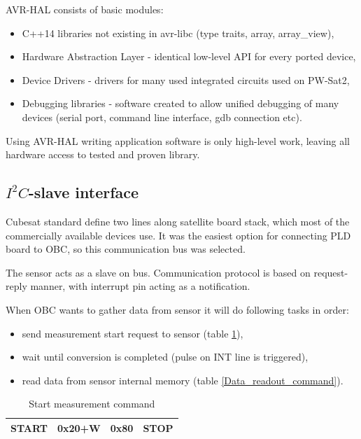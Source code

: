     AVR-HAL consists of basic modules:
    \begin{itemize}
        \item C++14 libraries not existing in avr-libc (type traits, array, array\_view),
        \item Hardware Abstraction Layer - identical low-level API for every ported device,
        \item Device Drivers - drivers for many used integrated circuits used on PW-Sat2,
        \item Debugging libraries - software created to allow unified debugging of many devices (serial port, command line interface, gdb connection etc).
    \end{itemize}

    Using AVR-HAL writing application software is only high-level work, leaving all hardware access to tested and proven library.

    \subsection{$I^2C$-slave interface}
    Cubesat standard define two \iic lines along satellite board stack, which most of the commercially available devices use. It was the easiest option for connecting PLD board to OBC, so this communication bus was selected.

    The sensor acts as a slave on \iic bus. Communication protocol is based on request-reply manner, with interrupt pin acting as a notification.

    When OBC wants to gather data from sensor it will do following tasks in order:
    \begin{itemize}
        \item send measurement start request to sensor (table \ref{Start_measurement_command}),
        \item wait until conversion is completed (pulse on INT line is triggered),
        \item read data from sensor internal memory (table \ref{Data_readout_command}).
    \end{itemize}

    \begin{table}[H]
        \begin{center}
            \begin{tabular}{|c|c|c|c|}
                \hline
                START & 0x20+W & 0x80 & STOP \\ \hline
            \end{tabular}
        \end{center}
        \caption{Start measurement command}
        \label{Start_measurement_command}
    \end{table}

